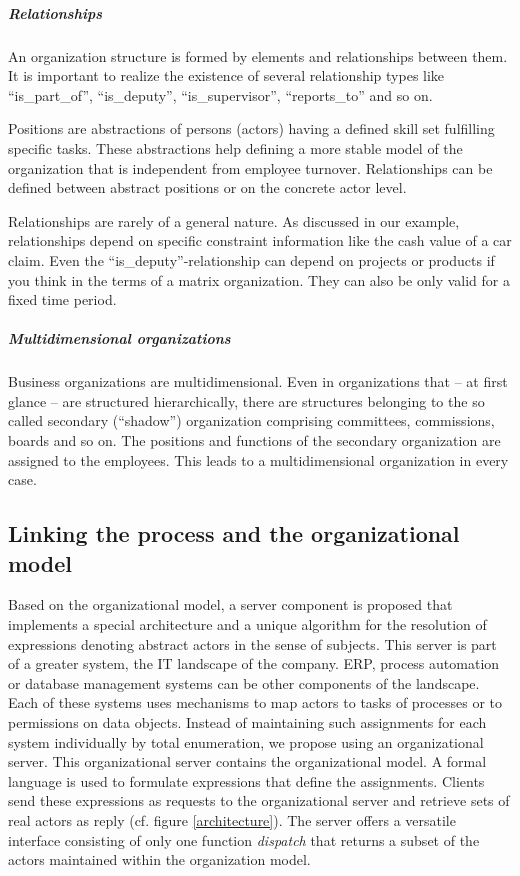 \subparagraph{Relationships}
An organization structure is formed by elements and relationships between them. It is important to realize the existence of several relationship types like ``is\_part\_of'', ``is\_deputy'', ``is\_supervisor'', ``reports\_to'' and so on. 
	
Positions are abstractions of persons (actors) having a defined skill set fulfilling specific tasks. These abstractions help defining a more stable model of the organization that is independent from employee turnover. Relationships can be defined between abstract positions or on the concrete actor level.	
	
Relationships are rarely of a general nature. As discussed in our example, relationships depend on specific constraint information like the cash value of a car claim. Even the ``is\_deputy''-relationship can depend on projects or products if you think in the terms of a matrix organization. They can also be only valid for a fixed time period. 
	
\subparagraph{Multidimensional organizations}
Business organizations are multidimensional. Even in organizations that -- at first glance -- are structured hierarchically, there are structures belonging to the so called secondary (``shadow'') organization comprising committees, commissions, boards and so on. The positions and functions of the secondary organization are assigned to the employees. This leads to a multidimensional organization in every case. %

\subsection{Linking the process and the organizational model} \label{chapter_Linking}

Based on the organizational model, a server component is proposed that implements a special architecture and a unique algorithm for the resolution of expressions denoting abstract actors in the sense of subjects. This server is part of a greater system, the IT landscape of the company. ERP, process automation or database management systems can be other components of the landscape. Each of these systems uses mechanisms to map actors to tasks of processes or to permissions on data objects. Instead of maintaining such assignments for each system individually by total enumeration, we propose using an organizational server. This organizational server contains the organizational model. A formal language is used to formulate expressions that define the assignments. Clients send these expressions as requests to the organizational server and retrieve sets of real actors as reply (cf. figure \ref{architecture}). The server offers a versatile interface consisting of only one function \emph{dispatch} that returns a subset of the actors maintained within the organization model. 


